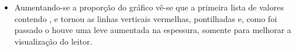 \documentclass[a4paper, 12pt]{article}
\begin{document}
\begin{itemize}
	\begin{itemize}
		\item[] Aumentando-se a proporção do gráfico vê-se que a primeira lista de valores contendo ,  e  tornou as linhas verticais vermelhas, pontilhadas e, como foi passado o  houve uma leve aumentada na espessura, somente para melhorar a visualização do leitor.
	\end{itemize}

	\end{itemize}
\end{document}
